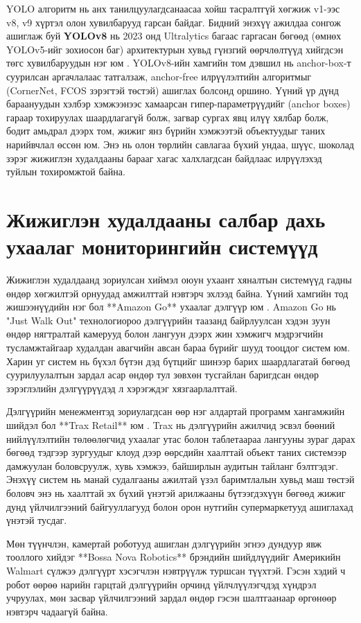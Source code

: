 YOLO алгоритм нь анх танилцуулагдсанаасаа хойш тасралтгүй хөгжиж v1-ээс v8, v9 хүртэл олон хувилбарууд гарсан байдаг. Бидний энэхүү ажилдаа сонгож ашиглаж буй \textbf{YOLOv8} нь 2023 онд Ultralytics багаас гаргасан бөгөөд (өмнөх YOLOv5-ийг зохиосон баг) архитектурын хувьд гүнзгий өөрчлөлтүүд хийгдсэн төгс хувилбаруудын нэг юм \cite{yolov8_ultralytics}. YOLOv8-ийн хамгийн том дэвшил нь anchor-box-т суурилсан аргачлалаас татгалзаж, anchor-free илрүүлэлтийн алгоритмыг (CornerNet, FCOS зэрэгтэй төстэй) ашиглах болсонд оршино. Үүний үр дүнд бараануудын хэлбэр хэмжээнээс хамаарсан гипер-параметрүүдийг (anchor boxes) гараар тохируулах шаардлагагүй болж, загвар сургах явц илүү хялбар болж, бодит амьдрал дээрх том, жижиг янз бүрийн хэмжээтэй объектуудыг таних нарийвчлал өссөн юм. Энэ нь олон төрлийн савлагаа бүхий ундаа, шүүс, шоколад зэрэг жижиглэн худалдааны барааг хагас халхлагдсан байдлаас илрүүлэхэд туйлын тохиромжтой байна.

\section{Жижиглэн худалдааны салбар дахь ухаалаг мониторингийн системүүд}
Жижиглэн худалдаанд зориулсан хиймэл оюун ухаант хяналтын системүүд гадны өндөр хөгжилтэй орнуудад амжилттай нэвтэрч эхлээд байна. Үүний хамгийн тод жишээнүүдийн нэг бол **Amazon Go** ухаалаг дэлгүүр юм \cite{amazon_go}. Amazon Go нь "Just Walk Out" технологиороо дэлгүүрийн таазанд байрлуулсан хэдэн зуун өндөр нягтралтай камерууд болон лангуун дээрх жин хэмжигч мэдрэгчийн тусламжтайгаар худалдан авагчийн авсан бараа бүрийг шууд тооцдог систем юм. Харин уг систем нь бүхэл бүтэн дэд бүтцийг шинээр барих шаардлагатай бөгөөд суурилуулалтын зардал асар өндөр тул зөвхөн тусгайлан баригдсан өндөр зэрэглэлийн дэлгүүрүүдэд л хэрэгждэг хязгаарлалттай.

Дэлгүүрийн менежментэд зориулагдсан өөр нэг алдартай программ хангамжийн шийдэл бол **Trax Retail** юм \cite{trax_retail}. Trax нь дэлгүүрийн ажилчид эсвэл бөөний нийлүүлэлтийн төлөөлөгчид ухаалаг утас болон таблетаараа лангууны зураг дарах бөгөөд тэдгээр зургуудыг клоуд дээр өөрсдийн хаалттай объект таних системээр дамжуулан боловсруулж, хувь хэмжээ, байширлын аудитын тайланг бэлтгэдэг. Энэхүү систем нь манай судалгааны ажилтай үзэл баримтлалын хувьд маш төстэй боловч энэ нь хаалттай эх бүхий үнэтэй арилжааны бүтээгдэхүүн бөгөөд жижиг дунд үйлчилгээний байгууллагууд болон орон нутгийн супермаркетууд ашиглахад үнэтэй тусдаг.

Мөн түүнчлэн, камертай роботууд ашиглан дэлгүүрийн эгнээ дундуур явж тооллого хийдэг **Bossa Nova Robotics** брэндийн шийдлүүдийг Америкийн Walmart сүлжээ дэлгүүрт хэсэгчлэн нэвтрүүлж туршсан түүхтэй. Гэсэн хэдий ч робот өөрөө нарийн гарцтай дэлгүүрийн орчинд үйлчлүүлэгчдэд хүндрэл учруулах, мөн засвар үйлчилгээний зардал өндөр гэсэн шалтгаанаар өргөнөөр нэвтэрч чадаагүй байна. 

